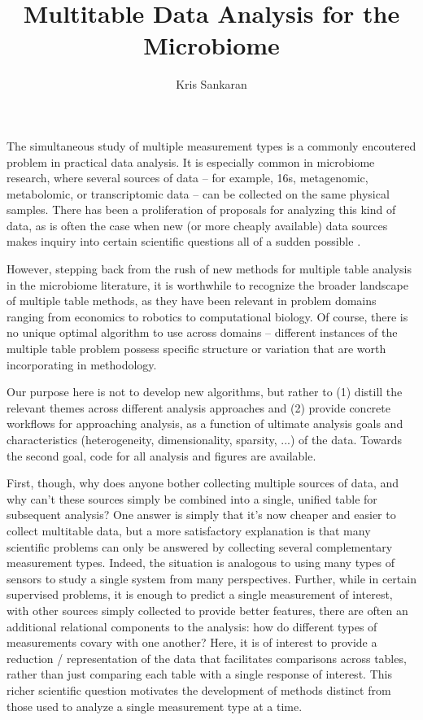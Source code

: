 \documentclass{article}
\title{Multitable Data Analysis for the Microbiome}
\author{Kris Sankaran}
\begin{document}
\maketitle

The simultaneous study of multiple measurement types is a commonly encoutered
problem in practical data analysis. It is especially common in microbiome
research, where several sources of data -- for example, 16s, metagenomic,
metabolomic, or transcriptomic data -- can be collected on the same physical
samples\citep{Franzosa2015, McHardy2013}. There has been a proliferation of
proposals for analyzing this kind of data, as is often the case when new (or
more cheaply available) data sources makes inquiry into certain scientific
questions all of a sudden possible \citep{Fukuyama2017, Rahnavard2017,
  Chaudhary2017, Chalise2017}.

However, stepping back from the rush of new methods for multiple table analysis
in the microbiome literature, it is worthwhile to recognize the broader
landscape of multiple table methods, as they have been relevant in problem
domains ranging from economics to robotics to computational biology. Of course,
there is no unique optimal algorithm to use across domains -- different
instances of the multiple table problem possess specific structure or variation
that are worth incorporating in methodology.

Our purpose here is not to develop new algorithms, but rather to (1) distill the
relevant themes across different analysis approaches and (2) provide concrete
workflows for approaching analysis, as a function of ultimate analysis goals and
characteristics (heterogeneity, dimensionality, sparsity, ...) of the data.
Towards the second goal, code for all analysis and figures are available.

First, though, why does anyone bother collecting multiple sources of data, and
why can't these sources simply be combined into a single, unified table for
subsequent analysis? One answer is simply that it's now cheaper and easier to
collect multitable data, but a more satisfactory explanation is that many
scientific problems can only be answered by collecting several complementary
measurement types. Indeed, the situation is analogous to using many types of
sensors to study a single system from many perspectives. Further, while in
certain supervised problems, it is enough to predict a single measurement of
interest, with other sources simply collected to provide better features, there
are often an additional relational components to the analysis: how do different
types of measurements covary with one another? Here, it is of interest to
provide a reduction / representation of the data that facilitates comparisons
across tables, rather than just comparing each table with a single response of
interest. This richer scientific question motivates the development of methods
distinct from those used to analyze a single measurement type at a time.
\end{document}
